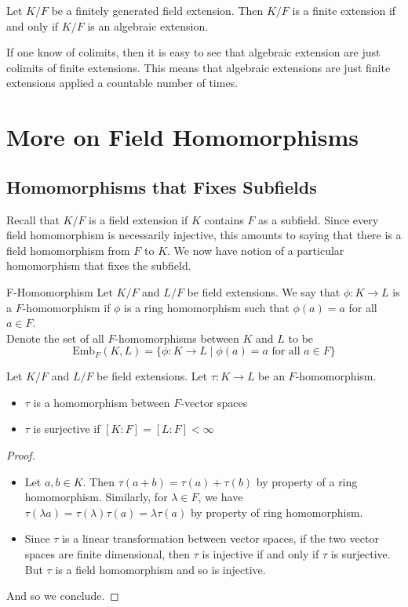 \documentclass[a4paper]{article}
\begin{document}
\begin{prp}{}{} Let $K/F$ be a finitely generated field extension. Then $K/F$ is a finite extension if and only if $K/F$ is an algebraic extension. 
\end{prp}

If one know of colimits, then it is easy to see that algebraic extension are just colimits of finite extensions. This means that algebraic extensions are just finite extensions applied a countable number of times. 

\pagebreak
\section{More on Field Homomorphisms}
\subsection{Homomorphisms that Fixes Subfields}
Recall that $K/F$ is a field extension if $K$ contains $F$ as a subfield. Since every field homomorphism is necessarily injective, this amounts to saying that there is a field homomorphism from $F$ to $K$. We now have notion of a particular homomorphism that fixes the subfield. 

\begin{defn}{F-Homomorphism}{} Let $K/F$ and $L/F$ be field extensions. We say that $\phi:K\to L$ is a $F$-homomorphism if $\phi$ is a ring homomorphism such that $\phi(a)=a$ for all $a\in F$. \\
Denote the set of all $F$-homomorphisms between $K$ and $L$ to be $$\text{Emb}_F(K,L)=\{\phi:K\to L\;|\;\phi(a)=a\text{ for all }a\in F\}$$
\end{defn}

\begin{prp}{}{} Let $K/F$ and $L/F$ be field extensions. Let $\tau:K\to L$ be an $F$-homomorphism. 
\begin{itemize}
\item $\tau$ is a homomorphism between $F$-vector spaces
\item $\tau$ is surjective if $[K:F]=[L:F]<\infty$
\end{itemize} 
\begin{proof}~\\
\begin{itemize}
\item Let $a,b\in K$. Then $\tau(a+b)=\tau(a)+\tau(b)$ by property of a ring homomorphism. Similarly, for $\lambda\in F$, we have $\tau(\lambda a)=\tau(\lambda)\tau(a)=\lambda\tau(a)$ by property of ring homomorphism. 
\item Since $\tau$ is a linear transformation between vector spaces, if the two vector spaces are finite dimensional, then $\tau$ is injective if and only if $\tau$ is surjective. But $\tau$ is a field homomorphism and so is injective. 
\end{itemize}
And so we conclude. 
\end{proof}
\end{prp}
\end{document}
